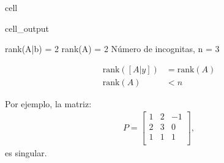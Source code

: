 \documentclass[letterpaper,10pt,english]{jupyterBook}
\begin{document}
\begin{sphinxuseclass}{cell}
\begin{sphinxVerbatimOutput}
\begin{sphinxuseclass}{cell_output}
\begin{sphinxVerbatim}[commandchars=\\\{\}]
rank(A|b) = 2
rank(A) = 2
Número de incognitas, n = 3
\end{sphinxVerbatim}

\end{sphinxuseclass}\end{sphinxVerbatimOutput}

\end{sphinxuseclass}\begin{align*}
\mathrm{rank}\left([A|y]\right) &= \mathrm{rank}\left(A\right) \\
\mathrm{rank}\left(A\right) &\lt n
\end{align*}\begin{quote}

\sphinxAtStartPar
{}
\end{quote}

\sphinxAtStartPar
{}

\sphinxAtStartPar
Por ejemplo, la matriz:
\begin{equation*}
\begin{split}P = \begin{bmatrix}
1 & 2 & -1 \\
2 & 3 &  0 \\
1 & 1 &  1 \\
\end{bmatrix},\end{split}
\end{equation*}
\sphinxAtStartPar
es singular.
\end{document}
